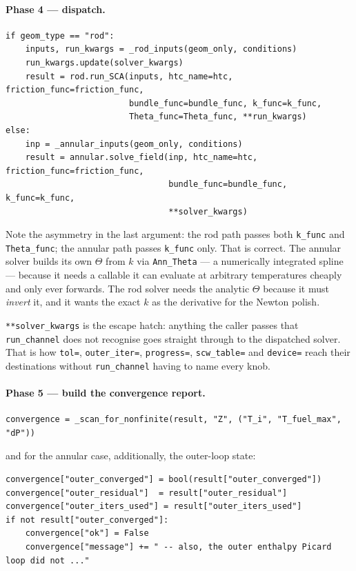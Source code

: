 \documentclass[11pt]{article}
\newcommand{\code}[1]{\texttt{#1}}
\begin{document}
\paragraph{Phase 4 --- dispatch.}
\begin{lstlisting}
if geom_type == "rod":
    inputs, run_kwargs = _rod_inputs(geom_only, conditions)
    run_kwargs.update(solver_kwargs)
    result = rod.run_SCA(inputs, htc_name=htc, friction_func=friction_func,
                         bundle_func=bundle_func, k_func=k_func,
                         Theta_func=Theta_func, **run_kwargs)
else:
    inp = _annular_inputs(geom_only, conditions)
    result = annular.solve_field(inp, htc_name=htc, friction_func=friction_func,
                                 bundle_func=bundle_func, k_func=k_func,
                                 **solver_kwargs)
\end{lstlisting}

Note the asymmetry in the last argument: the rod path passes both \code{k\_func} and
\code{Theta\_func}; the annular path passes \code{k\_func} only. That is correct. The
annular solver builds its own $\Theta$ from $k$ via \code{Ann\_Theta} --- a numerically
integrated spline --- because it needs a callable it can evaluate at arbitrary
temperatures cheaply and only ever forwards. The rod solver needs the analytic
$\Theta$ because it must \emph{invert} it, and it wants the exact $k$ as the derivative
for the Newton polish.

\code{**solver\_kwargs} is the escape hatch: anything the caller passes that
\code{run\_channel} does not recognise goes straight through to the dispatched solver.
That is how \code{tol=}, \code{outer\_iter=}, \code{progress=}, \code{scw\_table=} and
\code{device=} reach their destinations without \code{run\_channel} having to name every
knob.

\paragraph{Phase 5 --- build the convergence report.}
\begin{lstlisting}
convergence = _scan_for_nonfinite(result, "Z", ("T_i", "T_fuel_max", "dP"))
\end{lstlisting}
and for the annular case, additionally, the outer-loop state:
\begin{lstlisting}
convergence["outer_converged"] = bool(result["outer_converged"])
convergence["outer_residual"]  = result["outer_residual"]
convergence["outer_iters_used"] = result["outer_iters_used"]
if not result["outer_converged"]:
    convergence["ok"] = False
    convergence["message"] += " -- also, the outer enthalpy Picard loop did not ..."
\end{lstlisting}
\end{document}
